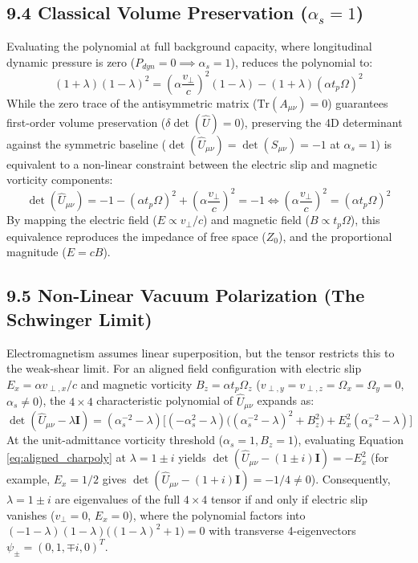 \subsection*{9.4 Classical Volume Preservation ($\alpha_s = 1$)} %
Evaluating the polynomial at full background capacity, where longitudinal dynamic pressure is zero ($P_{dyn} = 0 \implies \alpha_s = 1$), reduces the polynomial to: 
\begin{equation} 
    (1 + \lambda) (1 - \lambda)^2 = \left(\alpha \frac{v_\perp}{c}\right)^2 (1 - \lambda) - (1 + \lambda)(\alpha t_p \Omega)^2 
\end{equation} 
While the zero trace of the antisymmetric matrix ($\text{Tr}(A_{\mu\nu}) = 0$) guarantees first-order volume preservation ($\delta\det(\hat{U}) = 0$), preserving the 4D determinant against the symmetric baseline ($\det(\hat{U}_{\mu\nu}) = \det(S_{\mu\nu}) = -1$ at $\alpha_s = 1$) is equivalent to a non-linear constraint between the electric slip and magnetic vorticity components: 
\begin{equation} 
    \det(\hat{U}_{\mu\nu}) = -1 - (\alpha t_p \Omega)^2 + \left(\alpha \frac{v_\perp}{c}\right)^2 = -1 \iff \left(\alpha \frac{v_\perp}{c}\right)^2 = (\alpha t_p \Omega)^2 
\end{equation} 
By mapping the electric field ($E \propto v_\perp/c$) and magnetic field ($B \propto t_p \Omega$), this equivalence reproduces the impedance of free space ($Z_0$), and the proportional magnitude ($E = cB$). 

\subsection*{9.5 Non-Linear Vacuum Polarization (The Schwinger Limit)} 
Electromagnetism assumes linear superposition, but the tensor restricts this to the weak-shear limit. For an aligned field configuration with electric slip $E_x = \alpha v_{\perp,x}/c$ and magnetic vorticity $B_z = \alpha t_p \Omega_z$ ($v_{\perp,y} = v_{\perp,z} = \Omega_x = \Omega_y = 0$, $\alpha_s \neq 0$), the $4 \times 4$ characteristic polynomial of $\hat{U}_{\mu\nu}$ expands as: %
\begin{equation}
    \det(\hat{U}_{\mu\nu} - \lambda \mathbf{I}) = (\alpha_s^{-2} - \lambda)\Big[(-\alpha_s^2 - \lambda)\big((\alpha_s^{-2} - \lambda)^2 + B_z^2\big) + E_x^2 (\alpha_s^{-2} - \lambda)\Big] \label{eq:aligned_charpoly} %
\end{equation}
At the unit-admittance vorticity threshold ($\alpha_s = 1, B_z = 1$), evaluating Equation \ref{eq:aligned_charpoly} at $\lambda = 1 \pm i$ yields $\det(\hat{U}_{\mu\nu} - (1 \pm i)\mathbf{I}) = -E_x^2$ (for example, $E_x = 1/2$ gives $\det(\hat{U}_{\mu\nu} - (1+i)\mathbf{I}) = -1/4 \neq 0$). Consequently, $\lambda = 1 \pm i$ are eigenvalues of the full $4 \times 4$ tensor if and only if electric slip vanishes ($v_\perp = 0$, $E_x = 0$), where the polynomial factors into $(-1 - \lambda)(1 - \lambda)\big((1 - \lambda)^2 + 1\big) = 0$ with transverse 4-eigenvectors $\psi_\pm = (0, 1, \mp i, 0)^T$. %

